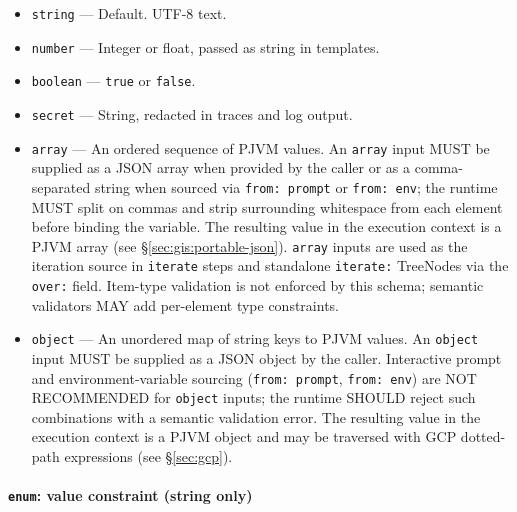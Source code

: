 \begin{itemize}
  \item \texttt{string} — Default. UTF-8 text.
  \item \texttt{number} — Integer or float, passed as string in templates.
  \item \texttt{boolean} — \texttt{true} or \texttt{false}.
  \item \texttt{secret} — String, redacted in traces and log output.
  \item \texttt{array} — An ordered sequence of PJVM values.  An \texttt{array}
        input MUST be supplied as a JSON array when provided by the caller or as
        a comma-separated string when sourced via \texttt{from: prompt} or
        \texttt{from: env}; the runtime MUST split on commas and strip surrounding
        whitespace from each element before binding the variable.  The resulting
        value in the execution context is a PJVM array (see \S\ref{sec:gis:portable-json}).
        \texttt{array} inputs are used as the iteration source in \texttt{iterate}
        steps and standalone \texttt{iterate:} TreeNodes via the \texttt{over:}
        field.  Item-type validation is not enforced by this schema; semantic
        validators MAY add per-element type constraints.
  \item \texttt{object} — An unordered map of string keys to PJVM values.  An
        \texttt{object} input MUST be supplied as a JSON object by the caller.
        Interactive prompt and environment-variable sourcing (\texttt{from: prompt},
        \texttt{from: env}) are NOT RECOMMENDED for \texttt{object} inputs; the
        runtime SHOULD reject such combinations with a semantic validation error.
        The resulting value in the execution context is a PJVM object and may be
        traversed with GCP dotted-path expressions (see \S\ref{sec:gcp}).
\end{itemize}

\paragraph{\texttt{enum}: value constraint (string only)}
\label{para:enum-constraint}

